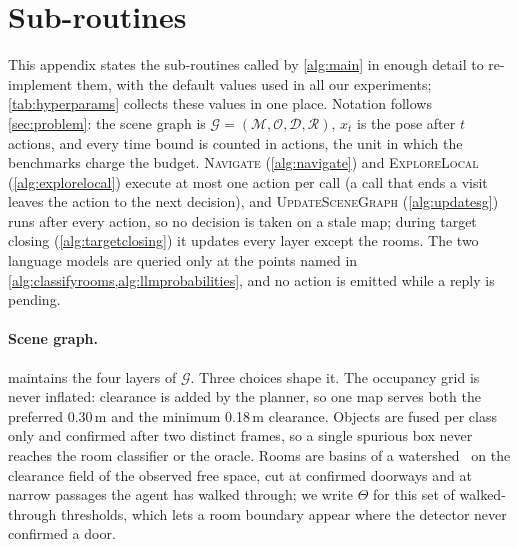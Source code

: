 \documentclass[10pt]{article}
\newcommand{\G}{\mathcal{G}}
\newcommand{\M}{\mathcal{M}}
\newcommand{\Ob}{\mathcal{O}}
\newcommand{\D}{\mathcal{D}}
\newcommand{\R}{\mathcal{R}}
\begin{document}
\clearpage
\appendix


\section{Sub-routines}\label{app:algorithms}

This appendix states the sub-routines called by \cref{alg:main} in enough detail to re-implement them, with the default values used in all our experiments; \cref{tab:hyperparams} collects these values in one place. Notation follows \cref{sec:problem}: the scene graph is $\G = (\M, \Ob, \D, \R)$, $x_t$ is the pose after $t$ actions, and every time bound is counted in actions, the unit in which the benchmarks charge the budget. \textsc{Navigate} (\cref{alg:navigate}) and \textsc{ExploreLocal} (\cref{alg:explorelocal}) execute at most one action per call (a call that ends a visit leaves the action to the next decision), and \textsc{UpdateSceneGraph} (\cref{alg:updatesg}) runs after every action, so no decision is taken on a stale map; during target closing (\cref{alg:targetclosing}) it updates every layer except the rooms. The two language models are queried only at the points named in \cref{alg:classifyrooms,alg:llmprobabilities}, and no action is emitted while a reply is pending.

\paragraph{Scene graph.}
 maintains the four layers of $\G$. Three choices shape it. The occupancy grid is never inflated: clearance is added by the planner, so one map serves both the preferred 0.30\,m and the minimum 0.18\,m clearance. Objects are fused per class only and confirmed after two distinct frames, so a single spurious box never reaches the room classifier or the oracle. Rooms are basins of a watershed~\citep{vincent1991watersheds} on the clearance field of the observed free space, cut at confirmed doorways and at narrow passages the agent has walked through; we write $\Theta$ for this set of walked-through thresholds, which lets a room boundary appear where the detector never confirmed a door.
\end{document}
